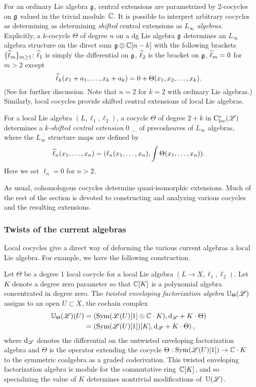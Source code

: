 For an ordinary Lie algebra $\fg$, central extensions are parametrized by 2-cocycles on $\fg$ valued in the trivial module~$\CC$. 
It is possible to interpret arbitrary cocycles as determining as determining {\em shifted} central extensions as {\em $L_\infty$ algebras}.
Explicitly, a $k$-cocycle $\Theta$ of degree $n$ on a dg Lie algebra $\fg$ determines an $L_\infty$ algebra structure on the direct sum $\fg \oplus \CC[n-k]$ with the following brackets $\{\Hat{\ell}_m\}_{m \geq 1}$: $\Hat{\ell}_1$ is simply the differential on $\fg$, $\Hat{\ell}_2$ is the bracket on $\fg$, $\Hat{\ell}_m = 0$ for $m >2$ except
\[
\Hat{\ell}_k(x_1 + a_1, \ldots, x_k + a_k) = 0+ \Theta(x_1,x_2,\ldots, x_k).
\]
(See  for further discussion. Note that $n=2$ for $k=2$ with ordinary Lie algebras.)
Similarly, local cocycles provide shifted central extensions of local Lie algebras.

\begin{dfn}
For a local Lie algebra $(L, \ell_1,\ell_2)$, a cocycle $\Theta$ of degree $2+k$ in $\cloc^*(\sL)$ determines a {\em $k$-shifted central extension}
\beqn\label{kext}
0 \to \CC[k] \to \Hat{\sL}_\Theta \to \sL {}
\eeqn
of precosheaves of $L_\infty$ algebras, where the $L_\infty$ structure maps are defined by
\[
\Hat{\ell}_n(x_1,\ldots,x_n) = (\ell_n(x_1,\ldots,x_n), \int \Theta(x_1,\ldots,x_n)).
\]
Here we set $\ell_n = 0$ for $n > 2$.
\end{dfn}

As usual, cohomologous cocycles determine quasi-isomorphic extensions. 
Much of the rest of the section is devoted to constructing and analyzing various cocycles and the resulting extensions.

\subsubsection{Twists of the current algebras}

Local cocycles give a direct way of deforming the various current algebras a local Lie algebra.
For example, we have the following construction.

\begin{dfn} 
Let $\Theta$ be a degree 1 local cocycle for a local Lie algebra $(L \to X, \ell_1,\ell_2)$. 
Let $K$ denote a degree zero parameter so that $\CC[K]$ is a polynomial algebra concentrated in degree zero.
The {\em twisted enveloping factorization algebra} $\UU_\Theta(\sL)$ assigns to an open $U \subset X$, the cochain complex
\begin{align*}
\UU_\Theta(\sL)(U) & = \left(\Sym(\sL(U)[1] \oplus \CC \cdot K), \d_{\sL} + K \cdot \Theta\right) \\
& = \left(\Sym(\sL(U)[1])[K] , \d_{\sL} + K \cdot \Theta\right),
\end{align*}
where $\d_{\sL}$ denotes the differential on the untwisted enveloping factorization algebra and $\Theta$ is the operator extending the cocycle $\Theta : \Sym(\sL(U)[1]) \to \CC \cdot K$ to the symmetric coalgebra as a graded coderivation.
This twisted enveloping factorization algebra is module for the commutative ring~$\CC[K]$,
and so specializing the value of $K$ determines nontrivial modifications of~$\UU(\sL)$. 
\end{dfn}

